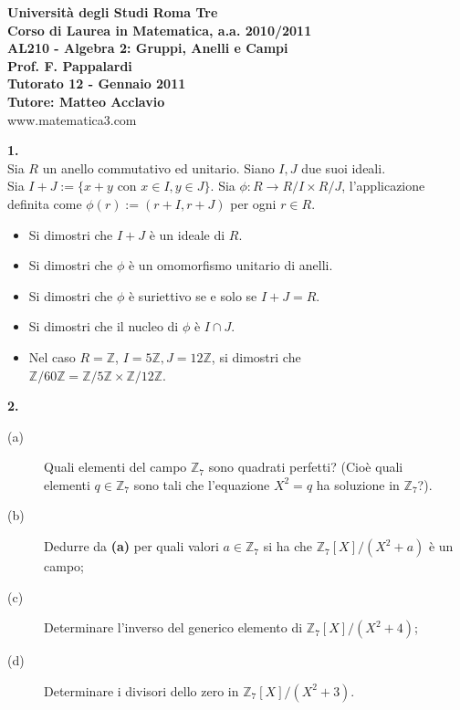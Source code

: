 \documentclass[italian,a4paper,11pt]
{article}
\newcommand{\Z}{\mathbb Z}
\newcommand{\acc}{\`}
\begin{document}
\begin{center}

\textbf{Universit\`a degli Studi Roma Tre}\\

\textbf{Corso di Laurea in Matematica, a.a. 2010/2011}\\

\textbf{AL210 - Algebra 2: Gruppi, Anelli e Campi}\\

\textbf{Prof. F. Pappalardi}\\

\textbf{Tutorato 12  - Gennaio 2011}\\

\textbf{Tutore: Matteo Acclavio}\\

www.matematica3.com\\
\end{center}

\vspace{0.4 cm}
\noindent
\begin{Ex}\textbf{ 1.}\\
Sia $R$ un anello commutativo ed unitario. Siano $I,J$ due suoi ideali.\\
Sia $I + J := \{x + y$ con $x \in I, y \in J\}$. Sia $\phi : R\longrightarrow R/I \times R/J$, l'applicazione definita come $\phi(r):= (r + I, r + J)$ per ogni $r\in R$.
\begin{itemize}
\item Si dimostri che $I + J$ \acc e un ideale di $R$.
\item Si dimostri che $\phi$ \acc e un omomorfismo unitario di anelli.
\item Si dimostri che $\phi$ \acc e suriettivo se e solo se $I + J = R$.
\item Si dimostri che il nucleo di $\phi$ \acc e $I\cap J$.
\item Nel caso $R = \Z$, $I = 5\Z, J = 12\Z$, si dimostri che\\ $\Z/60\Z = \Z/5\Z \times \Z/12\Z$.
\end{itemize}
\end{Ex}

\vspace{0.4cm}
\noindent
\begin{Ex}\textbf{ 2.}
\begin{description}
	\item[(a)]Quali elementi del campo $\Z_7$ sono quadrati perfetti? (Cio\`e quali \\ elementi $q\in \Z_7$ sono tali che l'equazione $X^2=q$ ha soluzione in $\Z_7$?).
	\item[(b)] Dedurre da \textbf{(a)} per quali valori $a\in \Z_7$ si ha che $\Z_7[X]/(X^2+a)$ \`e un campo;
	\item[(c)] Determinare l'inverso del generico elemento di $\Z_7[X]/(X^2+4)$;
	\item[(d)] Determinare i divisori dello zero in $\Z_7[X]/(X^2+3)$.
\end{description}
\end{Ex}
\end{document}
